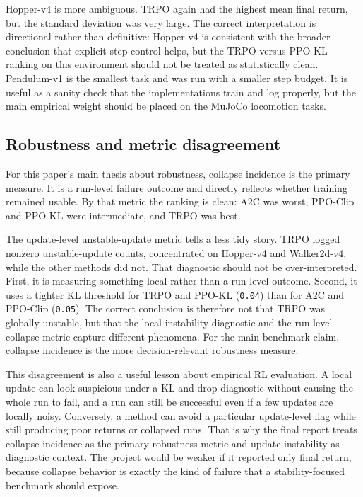 \documentclass{article}
\begin{document}
Hopper-v4 is more ambiguous. TRPO again had the highest mean final return, but the standard deviation was very large. The correct interpretation is directional rather than definitive: Hopper-v4 is consistent with the broader conclusion that explicit step control helps, but the TRPO versus PPO-KL ranking on this environment should not be treated as statistically clean. Pendulum-v1 is the smallest task and was run with a smaller step budget. It is useful as a sanity check that the implementations train and log properly, but the main empirical weight should be placed on the MuJoCo locomotion tasks.

\subsection{Robustness and metric disagreement}

For this paper's main thesis about robustness, collapse incidence is the primary measure. It is a run-level failure outcome and directly reflects whether training remained usable. By that metric the ranking is clean: A2C was worst, PPO-Clip and PPO-KL were intermediate, and TRPO was best.

The update-level unstable-update metric tells a less tidy story. TRPO logged nonzero unstable-update counts, concentrated on Hopper-v4 and Walker2d-v4, while the other methods did not. That diagnostic should not be over-interpreted. First, it is measuring something local rather than a run-level outcome. Second, it uses a tighter KL threshold for TRPO and PPO-KL (\texttt{0.04}) than for A2C and PPO-Clip (\texttt{0.05}). The correct conclusion is therefore not that TRPO was globally unstable, but that the local instability diagnostic and the run-level collapse metric capture different phenomena. For the main benchmark claim, collapse incidence is the more decision-relevant robustness measure.

This disagreement is also a useful lesson about empirical RL evaluation. A local update can look suspicious under a KL-and-drop diagnostic without causing the whole run to fail, and a run can still be successful even if a few updates are locally noisy. Conversely, a method can avoid a particular update-level flag while still producing poor returns or collapsed runs. That is why the final report treats collapse incidence as the primary robustness metric and update instability as diagnostic context. The project would be weaker if it reported only final return, because collapse behavior is exactly the kind of failure that a stability-focused benchmark should expose.
\end{document}
